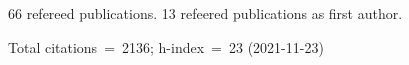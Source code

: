 66 refereed publications. 13 refeered publications as first author.

Total citations~=~2136; h-index~=~23 (2021-11-23)